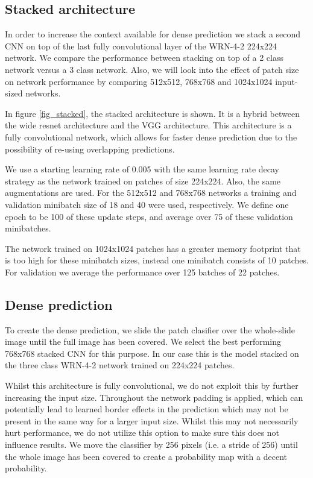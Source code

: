 \documentclass[journal]{IEEEtran}
\begin{document}
\subsection{Stacked architecture}

In order to increase the context available for dense prediction we stack a second CNN on top of the last fully convolutional layer of the WRN-4-2 224x224 network. We compare the performance between stacking on top of a 2 class network versus a 3 class network. Also, we will look into the effect of patch size on network performance by comparing 512x512, 768x768 and 1024x1024 input-sized networks. 

In figure \ref{fig_stacked}, the stacked architecture is shown. It is a hybrid between the wide resnet architecture and the VGG architecture. This architecture is a fully convolutional network, which allows for faster dense prediction due to the possibility of re-using overlapping predictions. 

We use a starting learning rate of 0.005 with the same learning rate decay strategy as the network trained on patches of size 224x224. Also, the same augmentations are used. For the 512x512 and 768x768 networks a training and validation minibatch size of 18 and 40 were used, respectively. We define one epoch to be 100 of these update steps, and average over 75 of these validation minibatches.

The network trained on 1024x1024 patches has a greater memory footprint that is too high for these minibatch sizes, instead one minibatch consists of 10 patches. For validation we average the performance over 125 batches of 22 patches.




\subsection{Dense prediction}
To create the dense prediction, we slide the patch clasifier over the whole-slide image until the full image has been covered. We select the best performing 768x768 stacked CNN for this purpose. In our case this is the model stacked on the three class WRN-4-2 network trained on 224x224 patches.

Whilst this architecture is fully convolutional, we do not exploit this by further increasing the input size. Throughout the network padding is applied, which can potentially lead to learned border effects in the prediction which may not be present in the same way for a larger input size. Whilst this may not necessarily hurt performance, we do not utilize this option to make sure this does not influence results. We move the classifier by 256 pixels (i.e. a stride of 256) until the whole image has been covered to create a probability map with a decent probability. 
\end{document}
